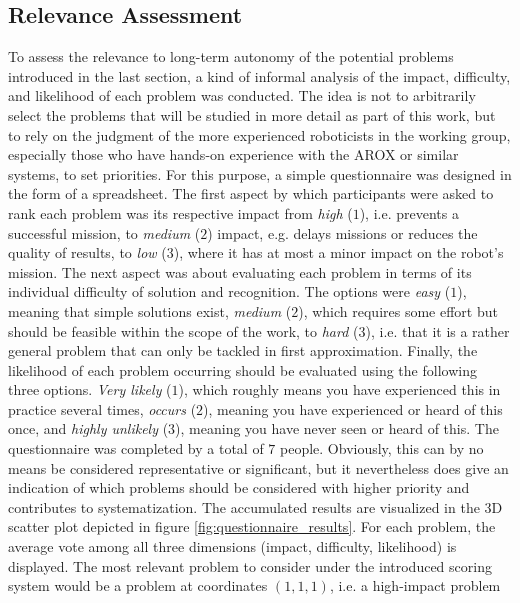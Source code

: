 \documentclass[english, master, utf8]{base/thesis_KBS}
\begin{document}
\subsection{Relevance Assessment}
\label{sec:relevance_assessment}

To assess the relevance to long-term autonomy of the potential problems introduced in the last section, a kind of informal analysis of the impact, 
difficulty, and likelihood of each problem was conducted. The idea is not to arbitrarily select the problems that will be studied in more detail as part
of this work, but to rely on the judgment of the more experienced roboticists in the working group, especially those who have hands-on experience with the
AROX or similar systems, to set priorities. For this purpose, a simple questionnaire was designed in the form of a spreadsheet. The first aspect by which participants 
were asked to rank each problem was its respective impact from \textit{high} ($1$), i.e. prevents a successful mission, to \textit{medium} ($2$) impact, e.g. delays missions 
or reduces the quality of results, to \textit{low} ($3$), where it has at most a minor impact on the robot's mission. The next aspect was about evaluating each problem in 
terms of its individual difficulty of solution and recognition. The options were \textit{easy} ($1$), meaning that simple solutions exist, \textit{medium} ($2$), which 
requires some effort but should be feasible within the scope of the work, to \textit{hard} ($3$), i.e. that it is a rather general problem that can only be tackled in first 
approximation. Finally, the likelihood of each problem occurring should be evaluated using the following three options. \textit{Very likely} ($1$), which roughly means you
have experienced this in practice several times, \textit{occurs} ($2$), meaning you have experienced or heard of this once, and \textit{highly unlikely} ($3$), meaning 
you have never seen or heard of this. The questionnaire was completed by a total of $7$ people. Obviously, this can by no means be considered representative or significant, but it 
nevertheless does give an indication of which problems should be considered with higher priority and contributes to systematization. The accumulated results are visualized in the
3D scatter plot depicted in figure \ref{fig:questionnaire_results}. For each problem, the average vote among all three dimensions (impact, difficulty, likelihood) is displayed.
The most relevant problem to consider under the introduced scoring system would be a problem at coordinates $(1, 1, 1)$, i.e. a high-impact problem 
\end{document}
